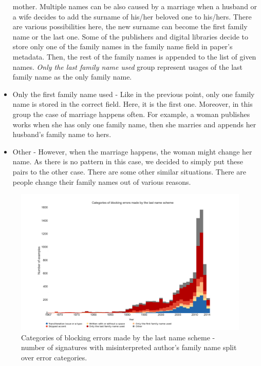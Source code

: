 \documentclass{pracamgr}
\begin{document}
\begin{itemize}
    mother. Multiple names can be also caused by a marriage when a husband or a wife
    decides to add the surname of his/her beloved one to his/hers. There are various
    possibilities here, the new surname can become the first family name or the last
    one. Some of the publishers and digital libraries decide to store only one of
    the family names in the family name field in paper's metadata. Then, the
    rest of the family names is appended to the list of given names.
    \textit{Only the last family name used} group 
    represent usages of the last family name as the only family name.
    \item Only the first family name used - Like in the previous point,
    only one family name is stored in the correct field. Here, it is the
    first one.
    Moreover, in this group the case of marriage happens often.
    For example, a woman publishes works when she has only one family name, then she
    marries and appends her husband's family name to hers.
    \item Other - However, when the marriage happens, the woman might change
    her name. As there is no pattern in this case, we decided to simply put these
    pairs to the other case. There are some other similar situations. There are people change
    their family names out of various reasons.
\end{itemize}

\begin{figure}
\includegraphics[width=\textwidth]{figures/blockerrors2}
\caption{Categories of blocking errors made by the last name scheme - number of
signatures with misinterpreted author's family name split over error categories.}
\label{fig:blockerrors2}
\end{figure}
\end{document}
